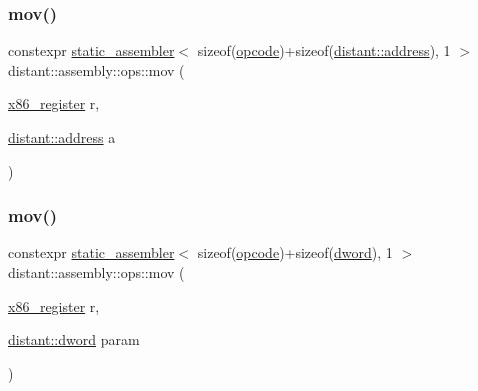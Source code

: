 \mbox{\label{namespacedistant_1_1assembly_1_1ops_ac6617216f842743f8b765b5afa70d7f7}} 
\subsubsection{\texorpdfstring{mov()}{mov()}\hspace{0.1cm}{\footnotesize\ttfamily [1/4]}}
{\footnotesize\ttfamily constexpr \mbox{\hyperlink{classdistant_1_1assembly_1_1static__assembler}{static\+\_\+assembler}}$<$ sizeof(\mbox{\hyperlink{namespacedistant_1_1assembly_a64d7b047d9e3df1ac04919f7c4f8f6fa}{opcode}})+sizeof(\mbox{\hyperlink{namespacedistant_a9d7aa6e07cb2f50321e29c209f9a7886}{distant\+::address}}), 1 $>$ distant\+::assembly\+::ops\+::mov (\begin{DoxyParamCaption}\item[{\mbox{\hyperlink{namespacedistant_1_1assembly_a873d3faa0111fc5605de36beaaaafb3e}{x86\+\_\+register}}}]{r,  }\item[{\mbox{\hyperlink{namespacedistant_a9d7aa6e07cb2f50321e29c209f9a7886}{distant\+::address}}}]{a }\end{DoxyParamCaption})\hspace{0.3cm}{\ttfamily [noexcept]}}

\mbox{\label{namespacedistant_1_1assembly_1_1ops_a71028b90bc6c2baaef92bec4afd3ead7}} 
\subsubsection{\texorpdfstring{mov()}{mov()}\hspace{0.1cm}{\footnotesize\ttfamily [2/4]}}
{\footnotesize\ttfamily constexpr \mbox{\hyperlink{classdistant_1_1assembly_1_1static__assembler}{static\+\_\+assembler}}$<$ sizeof(\mbox{\hyperlink{namespacedistant_1_1assembly_a64d7b047d9e3df1ac04919f7c4f8f6fa}{opcode}})+sizeof(\mbox{\hyperlink{namespacedistant_a9fa41a5a1a17dcbd24da1c1855c92489}{dword}}), 1 $>$ distant\+::assembly\+::ops\+::mov (\begin{DoxyParamCaption}\item[{\mbox{\hyperlink{namespacedistant_1_1assembly_a873d3faa0111fc5605de36beaaaafb3e}{x86\+\_\+register}}}]{r,  }\item[{\mbox{\hyperlink{namespacedistant_a9fa41a5a1a17dcbd24da1c1855c92489}{distant\+::dword}}}]{param }\end{DoxyParamCaption})\hspace{0.3cm}{\ttfamily [noexcept]}}

